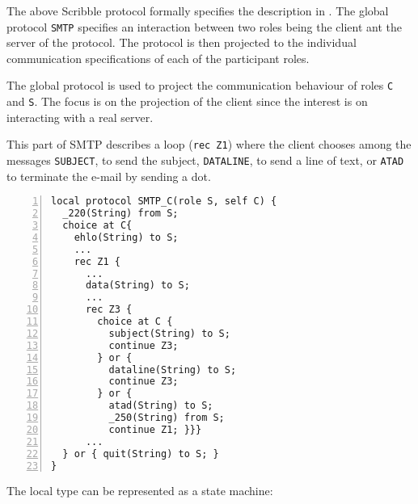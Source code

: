 The above Scribble protocol formally specifies
the description in .
The global protocol \lstinline|SMTP| specifies
an interaction between two roles being the client ant the server of the protocol.
The protocol is then projected to the
individual communication specifications of each 
of the participant roles.

The global protocol is used to project the communication
behaviour of roles \lstinline|C| and \lstinline|S|.
The focus is on the projection of the client
since the interest is on interacting with a real server.

This part of SMTP describes a loop (\lstinline|rec Z1|) where the client chooses
among the messages \lstinline|SUBJECT|, to send the subject,
\lstinline|DATALINE|, to send a line of text, or \lstinline|ATAD| to terminate the e-mail by sending a dot.

\begin{lstlisting}[numbers=left]
local protocol SMTP_C(role S, self C) {
  _220(String) from S;
  choice at C{
    ehlo(String) to S;
    ...
    rec Z1 {
      ...
      data(String) to S;
      ...
      rec Z3 {
        choice at C {
          subject(String) to S;
          continue Z3;
        } or {
          dataline(String) to S;
          continue Z3;
        } or {
          atad(String) to S;
          _250(String) from S;
          continue Z1; }}}
      ...
  } or { quit(String) to S; }
}
\end{lstlisting}
%

The local type can be represented as a state
machine:

